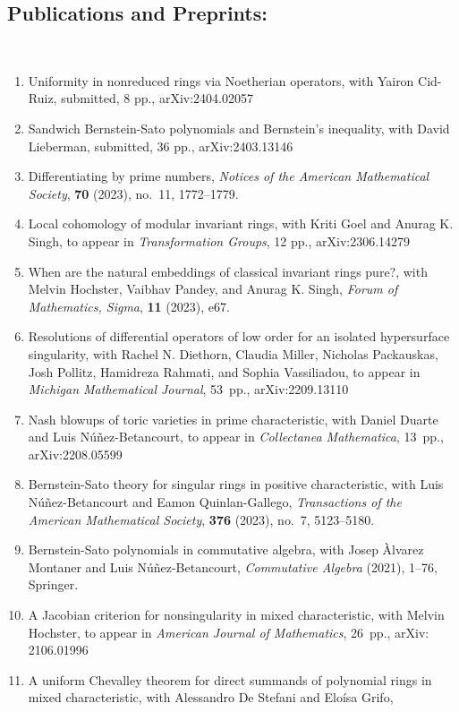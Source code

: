 \documentclass[12pt]{amsart}
\begin{document}
\subsection*{Publications and Preprints:}
\
\begin{enumerate}[leftmargin=9mm]
\item Uniformity in nonreduced rings via Noetherian operators,
with Yairon Cid-Ruiz,
submitted, 8 pp., arXiv:2404.02057
\item Sandwich Bernstein-Sato polynomials and Bernstein's inequality,
with David Lieberman,
submitted, 36 pp., arXiv:2403.13146
\item Differentiating by prime numbers,
\emph{Notices of the American Mathematical Society}, \textbf{70} (2023), no.~11, 1772--1779.
\item Local cohomology of modular invariant rings,
with Kriti Goel and Anurag K. Singh,
to appear in \emph{Transformation Groups}, 12 pp., arXiv:2306.14279
\item When are the natural embeddings of classical invariant rings pure?,
with Melvin Hochster, Vaibhav Pandey, and Anurag K. Singh,
\emph{Forum of Mathematics, Sigma}, \textbf{11} (2023), e67.
\item Resolutions of differential operators of low order for an isolated hypersurface singularity,
with Rachel N. Diethorn, Claudia Miller, Nicholas Packauskas, Josh Pollitz, Hamidreza Rahmati, and Sophia Vassiliadou,
to appear in \emph{Michigan Mathematical Journal}, 53~pp., arXiv:2209.13110
\item Nash blowups of toric varieties in prime characteristic, 
with Daniel Duarte and Luis Núñez-Betancourt,
to appear in \emph{Collectanea Mathematica}, 13~pp., arXiv:2208.05599
\item Bernstein-Sato theory for singular rings in positive characteristic, 
with Luis Núñez-Betancourt and Eamon Quinlan-Gallego, 
\emph{Transactions of the American Mathematical Society}, \textbf{376} (2023), no.~7, 5123--5180.
\item Bernstein-Sato polynomials in commutative algebra, 
with Josep \`Alvarez Montaner and Luis N\'u\~nez-Betancourt,
\emph{Commutative Algebra} (2021), 1--76, Springer.
\item A Jacobian criterion for nonsingularity in mixed characteristic, 
with Melvin Hochster,
to appear in \emph{American Journal of Mathematics}, 26~pp., arXiv: 2106.01996
\item A uniform Chevalley theorem for direct summands of polynomial rings in mixed characteristic, 
with Alessandro De Stefani and Elo\'isa Grifo,

\end{enumerate}
\end{document}
